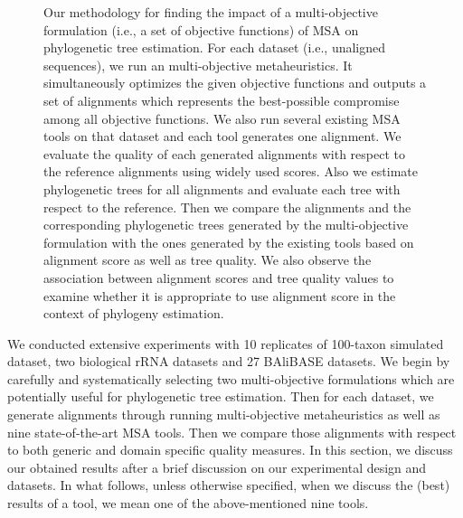 \begin{figure}[!htbp]
	\caption{Our methodology for finding the impact of a multi-objective formulation (i.e., a set of objective functions) of MSA on phylogenetic tree estimation. For each dataset (i.e., unaligned sequences), we run an multi-objective metaheuristics. It simultaneously optimizes the given objective functions and outputs a set of alignments which represents the best-possible compromise among all objective functions. We also run several existing MSA tools on that dataset and each tool generates one alignment. We evaluate the quality of each generated alignments with respect to the reference alignments using widely used scores. Also we estimate phylogenetic trees for all alignments and evaluate each tree with respect to the reference. Then we compare the alignments and the corresponding phylogenetic trees generated by the multi-objective formulation with the ones generated by the existing tools based on alignment score as well as tree quality. We also observe the association between alignment scores and tree quality values to examine whether it is appropriate to use alignment score in the context of phylogeny estimation.}
	\label{fig:pipeline}
\end{figure}


We conducted extensive experiments with 10 replicates of 100-taxon simulated dataset, two biological rRNA datasets and 27 BAliBASE datasets. We begin by carefully and systematically selecting two multi-objective formulations which are potentially useful for phylogenetic tree estimation. Then for each dataset, we generate alignments through running multi-objective metaheuristics as well as nine state-of-the-art MSA tools. Then we compare those alignments with respect to both generic and domain specific quality measures. In this section, we discuss our obtained results after a brief discussion on our experimental design and datasets. In what follows, unless otherwise specified, when we discuss the (best) results of a tool, we mean one of the above-mentioned nine tools.

